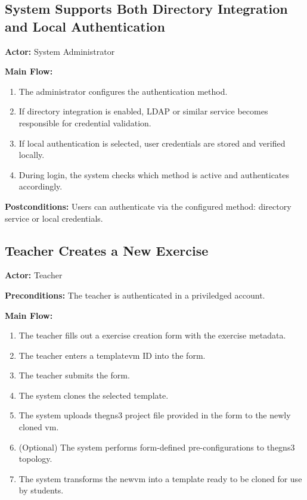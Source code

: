     \subsection{System Supports Both Directory Integration and Local Authentication}
        \textbf{Actor:} System Administrator

        \textbf{Main Flow:}
        \begin{enumerate}
            \item The administrator configures the authentication method.
            \item If directory integration is enabled, LDAP or similar service becomes responsible for credential validation.
            \item If local authentication is selected, user credentials are stored and verified locally.
            \item During login, the system checks which method is active and authenticates accordingly.
        \end{enumerate}

        \textbf{Postconditions:} Users can authenticate via the configured method: directory service or local credentials.


    \subsection{Teacher Creates a New Exercise}
        \textbf{Actor:} Teacher

        \textbf{Preconditions:} The teacher is authenticated in a priviledged account.

        \textbf{Main Flow:}
        \begin{enumerate}
            \item The teacher fills out a exercise creation form with the exercise metadata.
            \item The teacher enters a template\ac{vm} ID into the form.
            \item The teacher submits the form.
            \item The system clones the selected template.
            \item The system uploads the\ac{gns3} project file provided in the form to the newly cloned \ac{vm}.
            \item (Optional) The system performs form-defined pre-configurations to the\ac{gns3} topology.
            \item The system transforms the new\ac{vm} into a template ready to be cloned for use by students.
        \end{enumerate}


